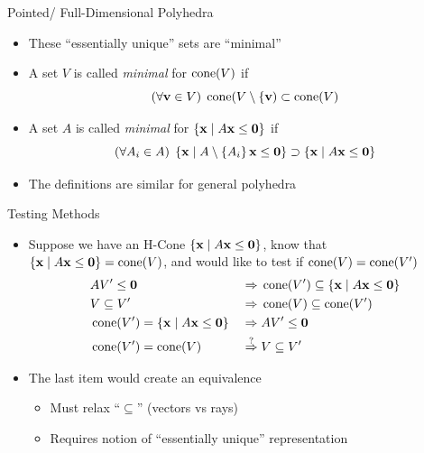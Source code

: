 \documentclass{beamer}
\begin{document}
\begin{frame}{Pointed/ Full-Dimensional Polyhedra}
\begin{itemize}
  \item These ``essentially unique'' sets are ``minimal''
  \item A set $V$ is called \textit{minimal} for $\operatorname{cone}(V)$ if
        \[ (\forall \mathbf{v}\in V)\; \operatorname{cone}(V\setminus\{\mathbf{v}) \subset \operatorname{cone}(V) \]
  \item A set $A$ is called \textit{minimal} for $\left\{\mathbf{x}\;|\; A\mathbf{x}\leq\mathbf{0}\right\}$ if
        \[ (\forall A_i \in A)\; \left\{\mathbf{x}\;|\; A\setminus\left\{A_i\right\}\mathbf{x}\leq\mathbf{0}\right\} \supset \left\{\mathbf{x}\;|\; A\mathbf{x}\leq\mathbf{0}\right\} \]
  \item The definitions are similar for general polyhedra
\end{itemize}
\end{frame}

\begin{frame}{Testing Methods}
\begin{itemize}
  \item Suppose we have an H-Cone $\left\{\mathbf{x}\;|\; A\mathbf{x}\leq\mathbf{0}\right\}$, know that $\left\{\mathbf{x}\;|\; A\mathbf{x}\leq\mathbf{0}\right\} = \operatorname{cone}(V)$, and would like to test if $\operatorname{cone}(V) = \operatorname{cone}(V')$
    \begin{alignat*}{2}
       & AV'\leq\mathbf{0} \;      & \Rightarrow & \; \operatorname{cone}(V') \subseteq \left\{\mathbf{x}\;|\; A\mathbf{x}\leq\mathbf{0}\right\}\\
       & V \subseteq V' \; & \Rightarrow & \; \operatorname{cone}(V) \subseteq \operatorname{cone}(V')\\
       & \operatorname{cone}(V') = \left\{\mathbf{x}\;|\; A\mathbf{x}\leq\mathbf{0}\right\} \;   & \Rightarrow & \; AV'\leq\mathbf{0} \\
       & \operatorname{cone}(V') = \operatorname{cone}(V)  \;& \overset{?}{\Rightarrow} & \; V \subseteq V'
    \end{alignat*}
  \item The last item would create an equivalence
  \begin{itemize}
    \item Must relax ``$\subseteq$'' (vectors vs rays)
    \item Requires notion of ``essentially unique'' representation
  \end{itemize}
\end{itemize}
\end{frame}
\end{document}
